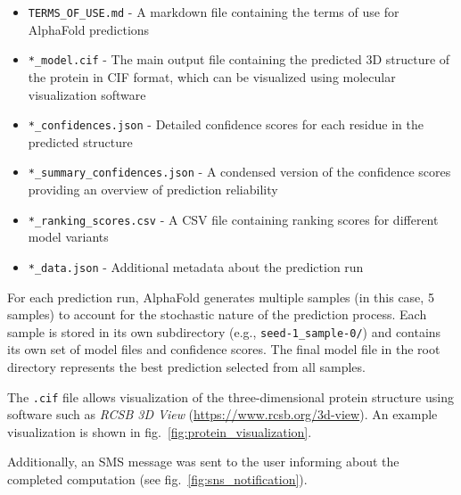 \begin{itemize}
    \item \texttt{TERMS\_OF\_USE.md} - A markdown file containing the terms of use for AlphaFold predictions
    \item \texttt{*\_model.cif} - The main output file containing the predicted 3D structure of the protein in CIF format, which can be visualized using molecular visualization software
    \item \texttt{*\_confidences.json} - Detailed confidence scores for each residue in the predicted structure
    \item \texttt{*\_summary\_confidences.json} - A condensed version of the confidence scores providing an overview of prediction reliability
    \item \texttt{*\_ranking\_scores.csv} - A CSV file containing ranking scores for different model variants
    \item \texttt{*\_data.json} - Additional metadata about the prediction run
\end{itemize}

For each prediction run, AlphaFold generates multiple samples (in this case, 5 samples) to account for the stochastic nature of the prediction process.
Each sample is stored in its own subdirectory (e.g., \texttt{seed-1\_sample-0/}) and contains its own set of model files and confidence scores.
The final model file in the root directory represents the best prediction selected from all samples.

The \texttt{.cif} file allows visualization of the three-dimensional protein structure using software such as \textit{RCSB 3D View} (\url{https://www.rcsb.org/3d-view}).
An example visualization is shown in fig.~\ref{fig:protein_visualization}.

Additionally, an SMS message was sent to the user informing about the completed computation (see fig.~\ref{fig:sns_notification}).

